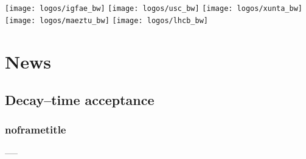 \documentclass[aspectratio=43,9pt]{beamer}
\begin{document}




\begin{frame}[plain,overlaytitlepage=0.9]
  \begin{minipage}[b][\textheight][b]{5cm}
    \texttt{[image: logos/igfae\_bw]}\hspace{1mm}
    \texttt{[image: logos/usc\_bw]}\hspace{1mm}
    \texttt{[image: logos/xunta\_bw]}\hspace{1mm}\\[2mm]
    \texttt{[image: logos/maeztu\_bw]}\hspace{1mm}
    \texttt{[image: logos/lhcb\_bw]}\\[-1mm]
  \end{minipage}
\end{frame}

\begin{frame}[plain,overlaytoc=0.9]
  \addtocounter{framenumber}{-1}
  \hspace*{5.3cm}\begin{minipage}{8cm}
    \tableofcontents
  \end{minipage}
\end{frame}







\section{News}



\subsection{Decay--time acceptance}
\begin{frame}[default] %
\frametitle{noframetitle}

-----

\end{frame} %
\end{document}
